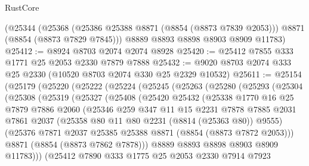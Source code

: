\begin{lexlean}{RustCore}
\begin{coremodule}
    (@25344
      (@25368 (@25386 @25388 @8871 (@8854 (@8873 @7839 @2053))) @8871 (@8854 (@8873 @7829 @7845)))
      @8889
      @8893
      @8898
      @8903
      @8909
      @11783)
@25412 := @8924 @8703 @2074 @2074 @8928
@25420 := @25412 @7855 @333 @1771 @25 @2053 @2330 @7879 @7888
@25432 := @9020 @8703 @2074 @333 @25 @2330 (@10520 @8703 @2074 @330 @25 @2329 @10532)
@25611 := @25154
    (@25179
      (@25220
        (@25222
          (@25224
            (@25245
              (@25263
                (@25280
                  (@25293
                    (@25304
                      (@25308
                        (@25319
                          (@25327
                            (@25408
                              (@25420
                                @25432
                                (@25338
                                  @1770
                                  @16
                                  @25
                                  @7879
                                  @7886
                                  @2060
                                  (@25346
                                    @259
                                    @347
                                    @11
                                    @15
                                    @2231
                                    @7878
                                    @7885
                                    @2031
                                    @7861
                                    @2037
                                    (@25358 @80 @11 @80 @2231 (@8814 (@25363 @80)) @9555)
                                    (@25376
                                      @7871
                                      @2037
                                      @25385
                                      @25388
                                      @8871
                                      (@8854 (@8873 @7872 @2053)))
                                    @8871
                                    (@8854 (@8873 @7862 @7878)))
                                  @8889
                                  @8893
                                  @8898
                                  @8903
                                  @8909
                                  @11783)))
                            (@25412
                              @7890
                              @333
                              @1775
                              @25
                              @2053
                              @2330
                              @7914
                              @7923

\end{coremodule}
\end{lexlean}
